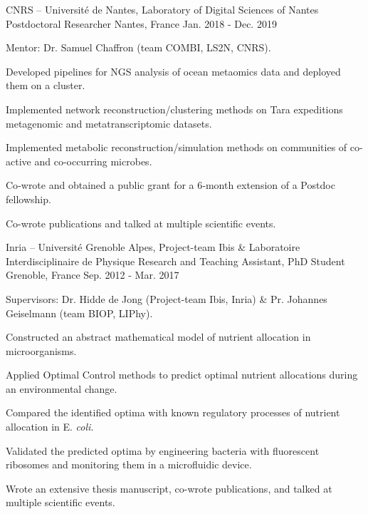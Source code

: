 \begin{cventries}
  \cventry
    {CNRS -- Université de Nantes, Laboratory of Digital Sciences of Nantes} %
    {Postdoctoral Researcher} %
    {Nantes, France} %
    {Jan. 2018 - Dec. 2019} %
    {
	Mentor: Dr. Samuel Chaffron (team COMBI, LS2N, CNRS).
    \vspace{0.5cm}
	\begin{cvitems} %
		\item {Developed pipelines for NGS analysis of ocean metaomics data and deployed them on a cluster.}
		\item {Implemented network reconstruction/clustering methods on Tara expeditions metagenomic and metatranscriptomic datasets.}
		\item {Implemented metabolic reconstruction/simulation methods on communities of co-active and co-occurring microbes.}
		\item {Co‑wrote and obtained a public grant for a 6‑month extension of a Postdoc fellowship.}
		\item {Co-wrote publications and talked at multiple scientific events.}
	\end{cvitems}
    }
    
  \cventry
    {Inria -- Université Grenoble Alpes, Project-team Ibis \& Laboratoire Interdisciplinaire de Physique} %
    {Research and Teaching Assistant, PhD Student} %
    {Grenoble, France} %
    {Sep. 2012 - Mar. 2017} %
    {
	Supervisors: Dr. Hidde de Jong (Project-team Ibis, Inria) \& Pr. Johannes Geiselmann (team BIOP, LIPhy).
    \vspace{0.5cm}
	\begin{cvitems} %
        \item {Constructed an abstract mathematical model of nutrient allocation in microorganisms.}
        \item {Applied Optimal Control methods to predict optimal nutrient allocations during an environmental change.}
        \item {Compared the identified optima with known regulatory processes of nutrient allocation in E. \textit{coli}.}
		\item {Validated the predicted optima by engineering bacteria with fluorescent ribosomes and monitoring them in a microfluidic device.}
		\item {Wrote an extensive thesis manuscript, co-wrote publications, and talked at multiple scientific events.}
	\end{cvitems}
    }
\end{cventries}    

